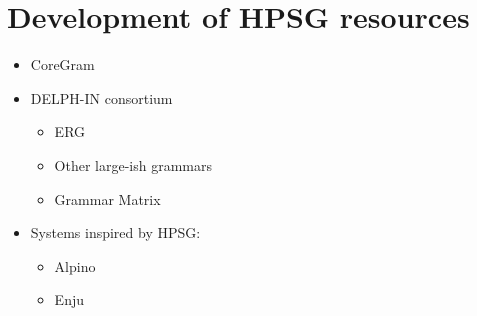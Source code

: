 \documentclass[output=paper]{langsci/langscibook}
\begin{document}
\section{Development of HPSG resources}
\label{cl:resources}


\begin{itemize}
 \item  CoreGram
 \item  DELPH-IN consortium
    \begin{itemize}
    \item ERG
    \item Other large-ish grammars
    \item Grammar Matrix
    \end{itemize}
 \item Systems inspired by HPSG:
   \begin{itemize}
     \item Alpino
     \item Enju
   \end{itemize}
\end{itemize}







\end{document}
